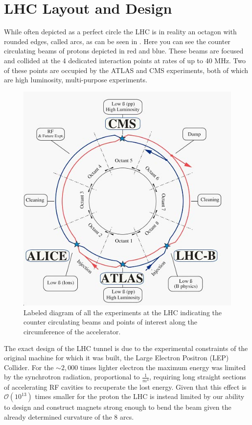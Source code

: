 \section{LHC Layout and Design} \label{sec:lhc:layout}

While often depicted as a perfect circle the LHC is in reality an octagon with
rounded edges, called arcs, as can be seen in .
Here you can see the counter circulating beams of protons depicted in red and
blue.  These beams are focused and collided at the 4 dedicated interaction
points at rates of up to 40 MHz.  Two of these points are occupied by the
ATLAS and CMS experiments, both of which are high luminosity, multi-purpose
experiments.

\begin{figure}[!htbp] 
  \begin{center}
    \includegraphics[width=0.9\linewidth]{figures/lhc/lhc_schematic.jpg}
    \caption{Labeled diagram of all the experiments at the LHC indicating the
counter circulating beams and points of interest along the circumference of the
accelerator.} 
    \label{fig:lhc_schematic} 
  \end{center} 
\end{figure}

The exact design of the LHC tunnel is due to the experimental constraints of the
original machine for which it was built, the Large Electron Positron (LEP)
Collider.  For the $\sim 2,000$ times lighter electron the maximum energy was
limited by the synchrotron radiation, proportional to $\frac{1}{m^4}$, requiring
long straight sections of accelerating RF cavities to recuperate the lost
energy.  Given that this effect is $\mathcal{O}(10^{13})$ times smaller for the
proton the LHC is instead limited by our ability to design and construct magnets
strong enough to bend the beam given the already determined curvature of the 8
arcs.

